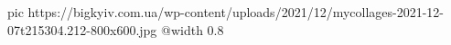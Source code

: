  
 
 
 
 

\ifcmt
  pic https://bigkyiv.com.ua/wp-content/uploads/2021/12/mycollages-2021-12-07t215304.212-800x600.jpg
  @width 0.8
\fi
